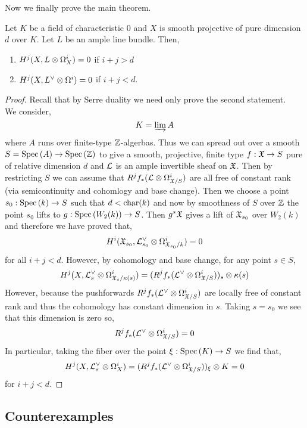 \documentclass[12pt]{article}
\begin{document}
\begin{rmk}
Now we finally prove the main theorem.
\end{rmk}

\begin{thm}
Let $K$ be a field of characteristic $0$ and $X$ is smooth projective of pure dimension $d$ over $K$. Let $L$ be an ample line bundle. Then,
\begin{enumerate}
\item $H^j(X, L \otimes \Omega_X^i) = 0$ if $i + j > d$
\item $H^j(X, L^{\vee} \otimes \Omega^i) = 0$ if $i + j < d$.
\end{enumerate}
\end{thm}

\begin{proof}
Recall that by Serre duality we need only prove the second statement.
\bigskip\\
We consider,
\[ K = \varinjlim A \]
where $A$ runs over finite-type $\mathbb{Z}$-algerbas. Thus we can spread out over a smooth $S = \mathrm{Spec}\left( A \right) \to \mathrm{Spec}\left( \mathbb{Z} \right)$ to give a smooth, projective, finite type $f : \mathfrak{X} \to S$ pure of relative dimension $d$ and $\mathcal{L}$ is an ample invertible sheaf on $\mathfrak{X}$. Then by restricting $S$ we can assume that $R^j f_* (\mathcal{L} \otimes \Omega^i_{\mathfrak{X}/S})$ are all free of constant rank (via semicontinuity and cohomlogy and base change). Then we choose a point $s_0 : \mathrm{Spec}\left( k \right) \to S$ such that $d < \operatorname{\mathrm{char}}(k)$ and now by smoothness of $S$ over $\mathbb{Z}$ the point $s_0$ lifts to $g : \mathrm{Spec}\left( W_2(k) \right) \to S$. Then $g^* \mathfrak{X}$ gives a lift of $\mathfrak{X}_{s_0}$ over $W_2(k)$ and therefore we have proved that,
\[ H^i(\mathfrak{X}_{s_0}, \mathcal{L}^{\vee}_{s_0} \otimes \Omega^i_{\mathfrak{X}_{s_0}/k}) = 0 \]
for all $i + j < d$. However, by cohomology and base change, for any point $s \in S$,
\[ H^j(X, \mathcal{L}^\vee_s \otimes \Omega^i_{\mathfrak{X}_s/\kappa(s)}) = (R^j f_* (\mathcal{L}^\vee \otimes \Omega^i_{\mathfrak{X}/S}))_s \otimes \kappa(s) \]
However, because the pushforwards $R^j f_* (\mathcal{L}^\vee \otimes \Omega^i_{\mathfrak{X}/S})$ are locally free of constant rank and thus the cohomology has constant dimension in $s$. Taking $s = s_0$ we see that this dimension is zero so,
\[ R^j f_* (\mathcal{L}^\vee \otimes \Omega^i_{\mathfrak{X} / S}) = 0 \]
In particular, taking the fiber over the point $\xi : \mathrm{Spec}\left( K \right) \to S$ we find that,
\[ H^j(X, \mathcal{L}_s^{\vee} \otimes \Omega^i_{X}) = (R^j f_* (\mathcal{L}^\vee \otimes \Omega^i_{\mathfrak{X}/S}))_\xi \otimes K = 0 \]
for $i + j < d$.
\end{proof}

\subsection{Counterexamples}
\end{document}
